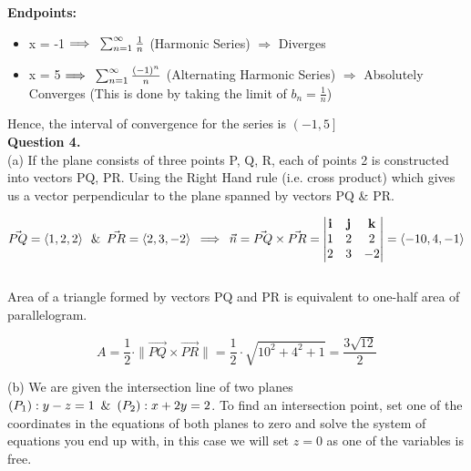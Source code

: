 \documentclass[a4paper]{exam}
\begin{document}
	\textbf{Endpoints: }
	
	\begin{itemize}
		\item x = -1 $\Longrightarrow \hspace{0.5em} \sum_{n = 1}^{\infty} \frac{1}{n}$ (Harmonic Series) $\Longrightarrow$ Diverges
		\item x = 5 $\Longrightarrow \hspace{0.5em} \sum_{n = 1}^{\infty} \frac{(-1)^{n}}{n}$ (Alternating Harmonic Series) $\Longrightarrow$ Absolutely Converges (This is done by taking the limit of $b_{n} = \frac{1}{n}$)
	\end{itemize}
	
	\vspace*{1mm}
	
	\noindent Hence, the interval of convergence for the series is $\left(-1, 5\right]$ \\[0.5ex]
	
	\noindent \textbf{Question 4.} \\[0.5em]	
	(a) If the plane consists of three points P, Q, R, each of points 2 is constructed into vectors PQ, PR. Using the Right Hand rule (i.e. cross product) which gives us a vector perpendicular to the plane spanned by vectors PQ \& PR.
	
	$$ 
	\vec{PQ} = \left\langle 1, 2, 2 \right\rangle \hspace*{0.5em} \& \hspace*{0.5em} \vec{PR} = \left\langle 2, 3, -2 \right\rangle \hspace*{0.5em} \Longrightarrow \hspace*{0.5em} \vec{n} = \vec{PQ} \times \vec{PR} = \begin{vmatrix} 
		\mathbf{i} & \mathbf{j} & \mathbf{k} \\ 
		1 & 2 & 2 \\ 
		2 & 3 & -2 
	\end{vmatrix} = \left\langle -10, 4, -1 \right\rangle
	$$\\[0.5em] 
	\noindent Area of a triangle formed by vectors PQ and PR is equivalent to one-half area of parallelogram.
	
	$$ A = \frac{1}{2} \cdot \|\vec{PQ} \times \vec{PR}\| = \frac{1}{2} \cdot \sqrt{10^{2} + 4^{2} + 1} = \frac{3\sqrt{12}}{2} $$
	
	\vspace*{1mm}
	
	\noindent (b) We are given the intersection line of two planes $(P_{1}) : y - z = 1 \hspace*{0.5em} \& \hspace*{0.5em} (P_{2}) : x + 2y = 2$. To find an intersection point, set one of the coordinates in the equations of both planes to zero and solve the system of equations you end up with, in this case we will set $z = 0$ as one of the variables is free.
	
\end{document}
